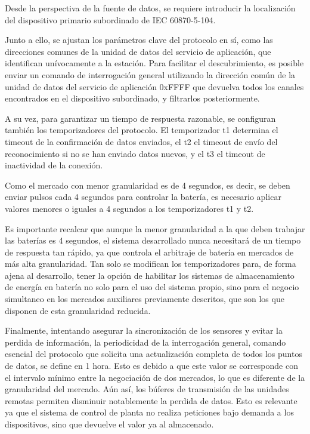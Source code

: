 Desde la perspectiva de la fuente de datos, se requiere introducir la localización del dispositivo primario subordinado de IEC 60870-5-104.

Junto a ello, se ajustan los parámetros clave del protocolo en sí, como las direcciones comunes de la unidad de datos del servicio de aplicación, que identifican unívocamente a la estación. Para facilitar el descubrimiento, es posible enviar un comando de interrogación general utilizando la dirección común de la unidad de datos del servicio de aplicación 0xFFFF que devuelva todos los canales encontrados en el dispositivo subordinado, y filtrarlos posteriormente.

A su vez, para garantizar un tiempo de respuesta razonable, se configuran también los temporizadores del protocolo. El temporizador t1 determina el timeout de la confirmación de datos enviados, el t2 el timeout de envío del reconocimiento si no se han enviado datos nuevos, y el t3 el timeout de inactividad de la conexión.

Como el mercado con menor granularidad es de 4 segundos, es decir, se deben enviar pulsos cada 4 segundos para controlar la batería, es necesario aplicar valores menores o iguales a 4 segundos a los temporizadores t1 y t2.

Es importante recalcar que aunque la menor granularidad a la que deben trabajar las baterías es 4 segundos, el sistema desarrollado nunca necesitará de un tiempo de respuesta tan rápido, ya que controla el arbitraje de batería en mercados de más alta granularidad. Tan solo se modifican los temporizadores para, de forma ajena al desarrollo, tener la opción de habilitar los sistemas de almacenamiento de energía en batería no solo para el uso del sistema propio, sino para el negocio simultaneo en los mercados auxiliares previamente descritos, que son los que disponen de esta granularidad reducida.

Finalmente, intentando asegurar la sincronización de los sensores y evitar la perdida de información, la periodicidad de la interrogación general, comando esencial del protocolo que solicita una actualización completa de todos los puntos de datos, se define en 1 hora. Esto es debido a que este valor se corresponde con el intervalo mínimo entre la negociación de dos mercados, lo que es diferente de la granularidad del mercado. Aún así, los búferes de transmisión de las unidades remotas permiten disminuir notablemente la perdida de datos. Esto es relevante ya que el sistema de control de planta no realiza peticiones bajo demanda a los dispositivos, sino que devuelve el valor ya al almacenado.

